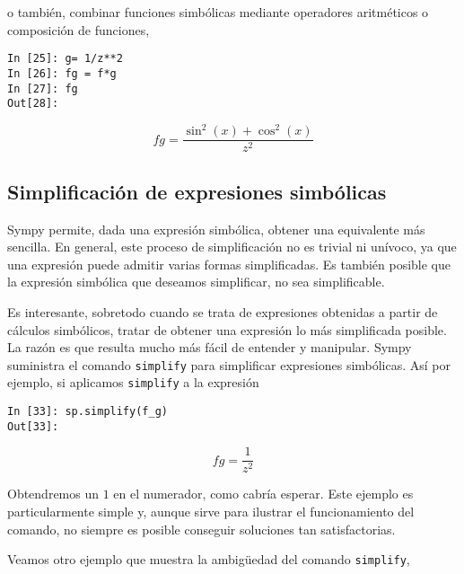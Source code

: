 \begin{paracol}{2}
o también, combinar funciones simbólicas mediante operadores aritméticos o composición de funciones,
\end{paracol}
 
\begin{center}
	\begin{minipage}{.25\textwidth}
		\begin{verbatim}
In [25]: g= 1/z**2
In [26]: fg = f*g
In [27]: fg
Out[28]:
		\end{verbatim}
	\end{minipage}
	\begin{equation*}
		fg = \frac{\sin^2(x) + \cos^2(x)}{z^2}
	\end{equation*}
\end{center}
\begin{paracol}{2}
\subsection{Simplificación de expresiones simbólicas}
Sympy permite, dada una expresión simbólica, obtener una equivalente más sencilla. En general, este proceso de simplificación no es trivial ni unívoco, ya que una expresión puede admitir varias formas simplificadas. Es también posible que la expresión simbólica que deseamos simplificar, no sea simplificable.

Es interesante, sobretodo cuando se trata de expresiones obtenidas a partir de cálculos simbólicos, tratar de obtener una expresión lo más simplificada posible. La razón es que resulta mucho más fácil de entender y manipular. Sympy suministra el comando \texttt{simplify} para simplificar expresiones simbólicas. Así por ejemplo, si aplicamos \texttt{simplify} a la expresión 
\end{paracol}
\begin{center}
	\begin{minipage}{.25\textwidth}
		\begin{verbatim}
In [33]: sp.simplify(f_g)
Out[33]: 
		\end{verbatim}
	\end{minipage}
	\begin{equation*}
		fg = \frac{1}{z^2}
	\end{equation*}
\end{center}
\begin{paracol}{2}
Obtendremos un $1$ en el numerador, como cabría esperar. Este ejemplo es particularmente simple y, aunque sirve para ilustrar el funcionamiento del comando, no siempre es posible conseguir soluciones tan satisfactorias.

Veamos otro ejemplo que muestra la ambigüedad del comando \texttt{simplify},
\end{paracol}

